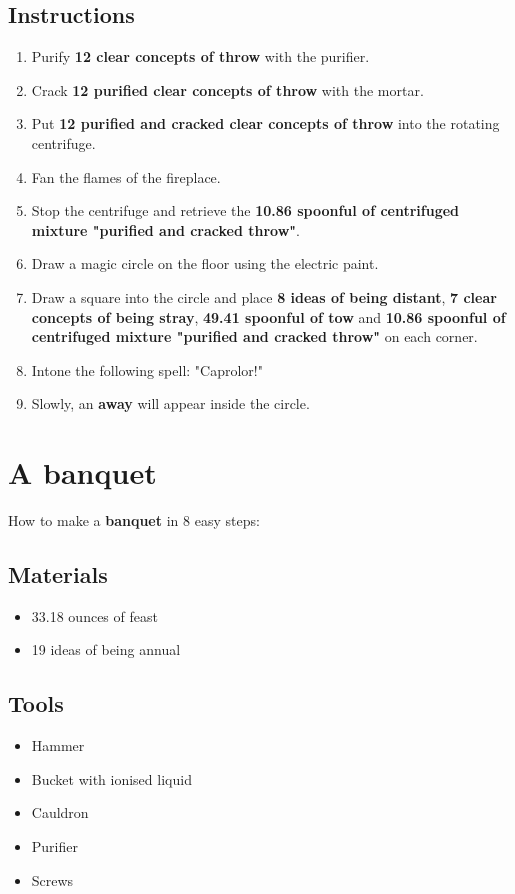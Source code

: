 \documentclass{article}
\begin{document}
\subsection{Instructions}\begin{enumerate}
\item 
Purify \textbf{12 clear concepts of throw} with the purifier.
\item 
Crack \textbf{12 purified clear concepts of throw} with the mortar.
\item 
Put \textbf{12 purified and cracked clear concepts of throw} into the rotating centrifuge.
\item 
Fan the flames of the fireplace.
\item 
Stop the centrifuge and retrieve the \textbf{10.86 spoonful of centrifuged mixture "purified and cracked throw"}.
\item 
Draw a magic circle on the floor using the electric paint.
\item 
Draw a square into the circle and place \textbf{8 ideas of being distant}, \textbf{7 clear concepts of being stray}, \textbf{49.41 spoonful of tow} and \textbf{10.86 spoonful of centrifuged mixture "purified and cracked throw"} on each corner.
\item 
Intone the following spell: "Caprolor!"
\item 
Slowly, an \textbf{away} will appear inside the circle.
\end{enumerate}
\newpage
\section{A banquet}How to make a \textbf{banquet} in 8 easy steps:

\subsection{Materials}\begin{itemize}
\item 
33.18 ounces of feast
\item 
19 ideas of being annual
\end{itemize}
\subsection{Tools}\begin{itemize}
\item 
Hammer
\item 
Bucket with ionised liquid
\item 
Cauldron
\item 
Purifier
\item 
Screws
\end{itemize}
\end{document}
